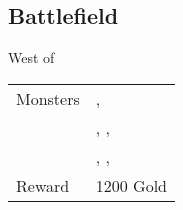 \subsection{Battlefield}
\label{map:battlefield_15}

West of 

\noindent\begin{tabularx}{\textwidth}[l]{lX}
	Monsters
	& \nameref{monster:flazzard}, \nameref{monster:flazzard} \\
	& \nameref{monster:plant_man}, \nameref{monster:plant_man}, \nameref{monster:sting_rat} \\
	& \nameref{monster:plant_man}, \nameref{monster:plant_man}, \nameref{monster:plant_man}
\\ \hline
	Reward & 1200 Gold
\end{tabularx}
